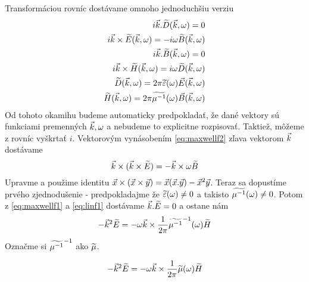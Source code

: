 Transformáciou rovníc dostávame omnoho jednoduchšiu verziu
\begin{eqnarray}
i \vec{k} . \widetilde{D}{(\vec{k},\omega)} = 0 \label{eq:maxwellf1} \\
i \vec{k} \times \widetilde{E}{(\vec{k},\omega)} = - i \omega \widetilde{B}{(\vec{k},\omega)}
\label{eq:maxwellf2} \\
i \vec{k} . \widetilde{B}{(\vec{k},\omega)} = 0 \label{eq:maxwellf3}\\
i \vec{k} \times \widetilde{H}{(\vec{k},\omega)} = i \omega \widetilde{D}{(\vec{k},\omega)} \label{eq:maxwellf4}\\
\widetilde{D}{(\vec{k},\omega)} = 2 \pi \widetilde{\varepsilon}(\omega) \vec{E}{(\vec{k},\omega)} \label{eq:linf1}\\
\widetilde{H}{(\vec{k},\omega)} = 2 \pi \widetilde{\mu^{-1}}(\omega) \vec{B}{(\vec{k},\omega)}
\end{eqnarray}
Od tohoto okamihu budeme automaticky predpokladať, že dané vektory sú
funkciami premenných $\vec{k},\omega$ a nebudeme to explicitne
rozpisovať.
Taktiež, môžeme z rovníc vyškrtať $i$.
Vektorovým vynásobením \ref{eq:maxwellf2} zľava vektorom $\vec{k}$
dostávame
\begin{equation}
    \vec{k} \times (\vec{k} \times \widetilde{E}) = - \vec{k}\times
    \omega \widetilde{B}
\end{equation}
Upravme a použime identitu $\vec{x} \times (\vec{x} \times
\vec{y}) = \vec{x} (\vec{x} . \vec{y}) - \vec{x}^2
\vec{y}$. Teraz sa dopustíme prvého zjednodušenie - predpokladajme
že $\widetilde{\varepsilon}(\omega)\not=0$ a takisto
$\widetilde{\mu^{-1}}(\omega)\not=0$. Potom z \ref{eq:maxwellf1} a \ref{eq:linf1} dostávame
$\vec{k}.\widetilde{E}=0$ a ostane nám
\begin{equation}
    - \vec{k}^2 \widetilde{E} = - \omega \vec{k} \times
    \frac{1}{2 \pi} \widetilde{\mu^{-1}}^{-1}(\omega) \widetilde{H}
\end{equation}
Označme si $\widetilde{\mu^{-1}}^{-1}$ ako $\widetilde{\mu}$.

\begin{equation}
    - \vec{k}^2 \widetilde{E} = - \omega \vec{k} \times
    \frac{1}{2 \pi} \widetilde{\mu}(\omega) \widetilde{H}
\end{equation}

